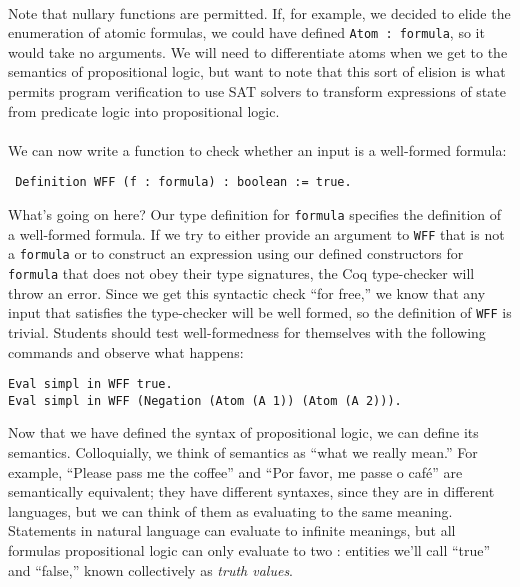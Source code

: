 \documentclass{article}
\begin{document}
\paragraph{}
Note that nullary functions are permitted. If, for example, we decided to elide the enumeration of atomic formulas, we could have defined \verb|Atom : formula|, so it would take no arguments. We will need to differentiate atoms when we get to the semantics of propositional logic, but want to note that this sort of elision is what permits program verification to use SAT solvers to transform expressions of state from predicate logic into propositional logic.
\paragraph{}
We can now write a function to check whether an input is a well-formed formula:
 
 \begin{lstlisting}
 Definition WFF (f : formula) : boolean := true. 
 \end{lstlisting}
 
What's going on here? Our type definition for \verb|formula| specifies the definition of a well-formed formula. If we try to either provide an argument to \verb|WFF| that is not a \verb|formula| or to construct an expression using our defined constructors for \verb|formula| that does not obey their type signatures, the Coq type-checker will throw an error. Since we get this syntactic check ``for free,'' we know that any input that satisfies the type-checker will be well formed, so the definition of \verb|WFF| is trivial. Students should test well-formedness for themselves with the following commands and observe what happens:
\begin{lstlisting}
Eval simpl in WFF true.
Eval simpl in WFF (Negation (Atom (A 1)) (Atom (A 2))).
\end{lstlisting}

Now that we have defined the syntax of propositional logic, we can define its semantics. Colloquially, we think of semantics as ``what we really mean.'' For example, ``Please pass me the coffee'' and ``Por favor, me passe o caf\'e'' are semantically equivalent; they have different syntaxes, since they are in different languages, but we can think of them as evaluating to the same meaning. Statements in natural language can evaluate to infinite meanings, but all formulas propositional logic can only evaluate to two : entities we'll call ``true'' and ``false,'' known collectively as \emph{truth values}.
\end{document}

